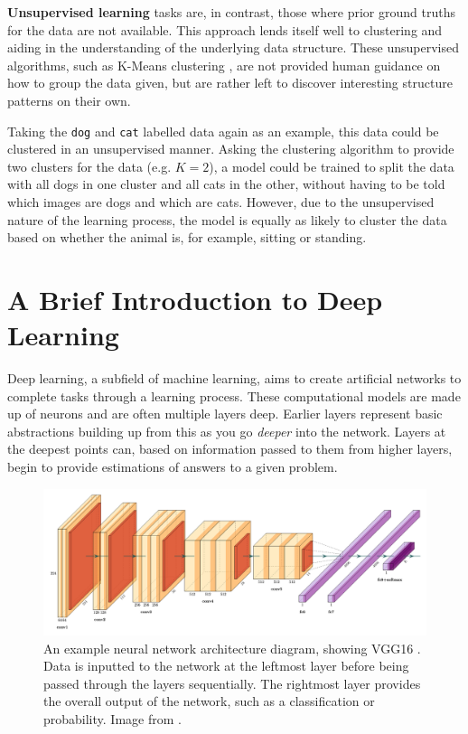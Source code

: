 \textbf{Unsupervised learning} tasks are, in contrast, those where prior ground truths for the data are not available. This approach lends itself well to clustering and aiding in the understanding of the underlying data structure. These unsupervised algorithms, such as K-Means clustering \cite{hartigan_algorithm_1979}, are not provided human guidance on how to group the data given, but are rather left to discover interesting structure patterns on their own. 

Taking the \texttt{dog} and \texttt{cat} labelled data again as an example, this data could be clustered in an unsupervised manner. Asking the clustering algorithm to provide two clusters for the data  (e.g. $K = 2$), a model could be trained to split the data with all dogs in one cluster and all cats in the other, without having to be told which images are dogs and which are cats. However, due to the unsupervised nature of the learning process, the model is equally as likely to cluster the data based on whether the animal is, for example, sitting or standing. 

\section{A Brief Introduction to Deep Learning}\label{ch:Background,sec:DLIntro}

Deep learning, a subfield of machine learning, aims to create artificial networks to complete tasks through a learning process. These computational models are made up of neurons and are often multiple layers deep. Earlier layers represent basic abstractions building up from this as you go \textit{deeper} into the network. Layers at the deepest points can, based on information passed to them from higher layers, begin to provide estimations of answers to a given problem.

\begin{figure}
	\begin{center}
		\includegraphics[scale=0.2]{Chapter2/figs/example-model.png}
	\end{center}
	\caption[An example neural network architecture diagram, showing VGG16 \cite{simonyan_very_2015}]{An example neural network architecture diagram, showing VGG16 \cite{simonyan_very_2015}. Data is inputted to the network at the leftmost layer before being passed through the layers sequentially. The rightmost layer provides the overall output of the network, such as a classification or probability. Image from \cite{harislqbal88_plotneuralnet_2018}.}
	\label{fig:NN-example}
\end{figure}

